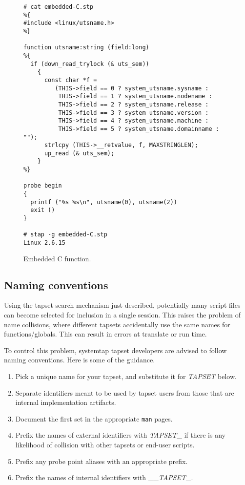 \documentclass{article}
\newenvironment{boxedminipage}%
    {\begin{makeimage}\begin{center}\begin{Sbox}\begin{minipage}}%
    {\end{minipage}\end{Sbox}\fbox{\TheSbox}\end{center}\end{makeimage}}
\renewcommand{\nomenclature}[2]{}
\begin{document}
\begin{figure}[!ht]
\begin{boxedminipage}{4.5in}
\begin{verbatim}
# cat embedded-C.stp
%{
#include <linux/utsname.h>
%}

function utsname:string (field:long)
%{
  if (down_read_trylock (& uts_sem))
    {
      const char *f =
         (THIS->field == 0 ? system_utsname.sysname :
          THIS->field == 1 ? system_utsname.nodename :
          THIS->field == 2 ? system_utsname.release :
          THIS->field == 3 ? system_utsname.version :
          THIS->field == 4 ? system_utsname.machine :
          THIS->field == 5 ? system_utsname.domainname : "");
      strlcpy (THIS->__retvalue, f, MAXSTRINGLEN);
      up_read (& uts_sem);
    }
%}

probe begin
{
  printf ("%s %s\n", utsname(0), utsname(2))
  exit ()
}

# stap -g embedded-C.stp
Linux 2.6.15
\end{verbatim}
\end{boxedminipage}
\caption{Embedded C function.}
\label{fig:embedded-C}
\end{figure}

\subsection{Naming conventions}

Using the tapset search mechanism just described, potentially many
script files can become selected for inclusion in a single session.
This raises the problem of name collisions, where different tapsets
accidentally use the same names for functions/globals.  This can
result in errors at translate or run time.

To control this problem, systemtap tapset developers are advised to
follow naming conventions.  Here is some of the guidance.
\nomenclature{naming convention}{Guidelines for naming variables and
functions to prevent unintentional duplication.}
\begin{enumerate}
\item Pick a unique name for your tapset, and substitute it for
{\em TAPSET} below.
\item Separate identifiers meant to be used by tapset users from
those that are internal implementation artifacts.
\item Document the first set in the appropriate \verb+man+ pages.
\item Prefix the names of external identifiers with {\em TAPSET}\_ if
there is any likelihood of collision with other tapsets or end-user
scripts.
\item Prefix any probe point aliases with an appropriate prefix.
\item Prefix the names of internal identifiers with \_\_{\em TAPSET}\_.
\end{enumerate}
\end{document}
